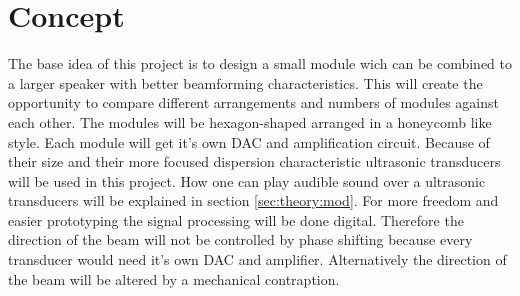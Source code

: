 \chapter{Concept}\label{sec:concept}


The base idea of this project is to design a small module wich can be combined to a larger speaker with better beamforming characteristics. This will create the opportunity to compare different arrangements and numbers of modules against each other. The modules will be hexagon-shaped arranged in a honeycomb like style. Each module will get it's own DAC and amplification circuit.\p
Because of their size and their more focused dispersion characteristic ultrasonic transducers will be used in this project. How one can play audible sound over a ultrasonic transducers will be explained in section \ref{sec:theory:mod}.\p
For more freedom and easier prototyping the signal processing will be done digital. Therefore the direction of the beam will not be controlled by phase shifting because every transducer would need it's own DAC and amplifier. Alternatively the direction of the beam will be altered by a mechanical contraption.